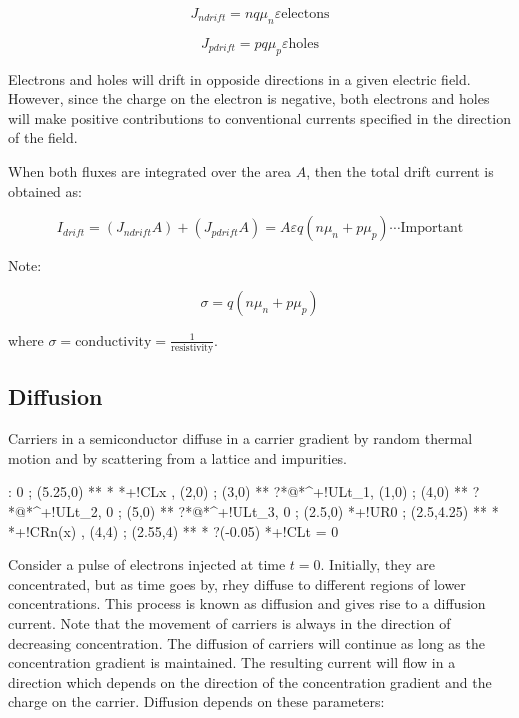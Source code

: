 \documentclass[a4paper,12pt]{article}
\begin{document}
\[ J_{n drift} = n q \mu_{n} \varepsilon \mbox{electons} \]

\[ J_{p drift} = p q \mu_{p} \varepsilon \mbox{holes} \]

Electrons and holes will drift in opposide directions in a
given electric field. However, since the charge on the electron is
negative, both electrons and holes will make positive contributions to
conventional currents specified in the direction of the field.

When both fluxes are integrated over the area $A$, then the
total drift current is obtained as:

\[ I_{drift} = (J_{n drift} A) + (J_{p drift} A) = A \varepsilon q (n
\mu_{n} + p \mu_{p}) \cdots \mbox{Important} \]

Note:

\[ \sigma = q (n \mu_{n} + p \mu_{p}) \]

where $\sigma = \mbox{conductivity} = \frac{1}{\mbox{resistivity}} $.

\subsection{Diffusion}

Carriers in a semiconductor diffuse in a carrier gradient by random
thermal motion and by scattering from a lattice and impurities.

\begin{table}[hbtp]

\xy <1cm,0cm>:
0 ; (5.25,0) **\dir{-} *\dir{>} *+!CL{x} , 
(2,0) ; (3,0) ** ?*@{}*^+!UL{t_{1}},
(1,0) ; (4,0) ** ?*@{}*^+!UL{t_{2}},
0 ; (5,0) ** ?*@{}*^+!UL{t_{3}},
0 ; (2.5,0) *+!UR{0} ;
(2.5,4.25) **\dir{-} *\dir{>} *+!CR{n(x)} ,
(4,4) ; (2.55,4) **\dir{-} *\dir{>} ?(-0.05) *+!CL{t = 0}
\endxy

\end{table}

Consider a pulse of electrons injected at time $t = 0$.
Initially, they are concentrated, but as time goes by, rhey diffuse to
different regions of lower concentrations. This process is known as
diffusion and gives rise to a diffusion current. Note that the movement
of carriers is always in the direction of decreasing concentration. The
diffusion of carriers will continue as long as the concentration
gradient is maintained. The resulting current will flow in a direction
which depends on the direction of the concentration gradient and the
charge on the carrier. Diffusion depends on these parameters:
\end{document}
